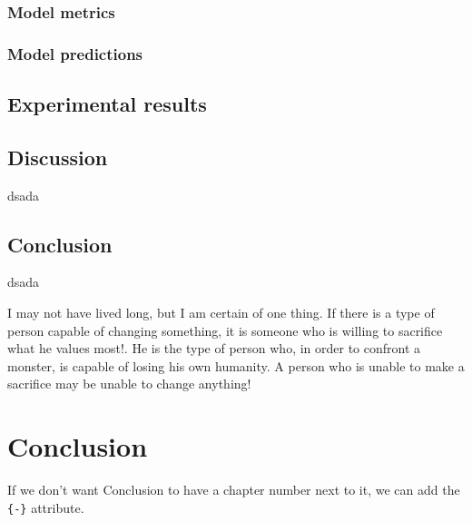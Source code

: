 \documentclass[a4paper, nobind]{templates/cdethesis}
\begin{document}
\hypertarget{model-metrics}{%
\subsection{Model metrics}\label{model-metrics}}

\label{section:metrics}

\hypertarget{model-predictions}{%
\subsection{Model predictions}\label{model-predictions}}

\hypertarget{experimental-results}{%
\section{Experimental results}\label{experimental-results}}

\hypertarget{discussion}{%
\section{Discussion}\label{discussion}}

dsada

\hypertarget{conclusion}{%
\section{Conclusion}\label{conclusion}}

dsada

\begin{savequote}
I may not have lived long, but I am certain of one thing. If there is a
type of person capable of changing something, it is someone who is
willing to sacrifice what he values most!. He is the type of person who,
in order to confront a monster, is capable of losing his own humanity. A
person who is unable to make a sacrifice may be unable to change
anything!
\end{savequote}



\hypertarget{conclusion-1}{%
\chapter*{Conclusion}\label{conclusion-1}}

If we don't want Conclusion to have a chapter number next to it, we can add the \texttt{\{-\}} attribute.
\end{document}
